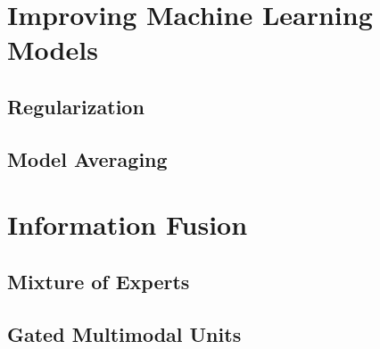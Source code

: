 

\section{Improving Machine Learning Models}

\subsection{Regularization}

\subsection{Model Averaging}

\section{Information Fusion}

\subsection{Mixture of Experts}

\subsection{Gated Multimodal Units}



